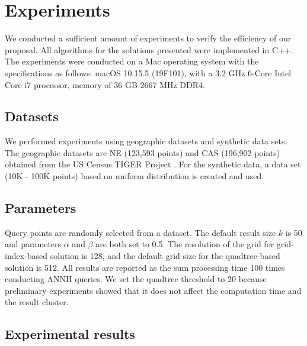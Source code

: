 \documentclass[a4paper,11pt]{report}
\theoremstyle{mytheoremstyle}
\begin{document}
\chapter{Experiments}
\label{section:experiments}

We conducted a sufficient amount of experiments to verify the efficiency of our proposal. All algorithms for the solutions presented were implemented in C++. The experiments were conducted on a Mac operating system with the specifications as follows: macOS 10.15.5 (19F101), with a 3.2 GHz 6-Core Intel Core i7 processor, memory of 36 GB 2667 MHz DDR4.

\section{Datasets}
We performed experiments using geographic datasets and synthetic data sets. The geographic datasets are NE (123,593 points) and CAS (196,902 points) obtained from the US Census TIGER Project \cite{chorochronos}. For the synthetic data, a data set (10K - 100K points) based on uniform distribution is created and used.

\section{Parameters}
Query points are randomly selected from a dataset. The default result size $k$ is 50 and parameters $\alpha$ and $\beta$ are both set to 0.5. The resolution of the grid for grid-index-based solution is 128, and the default grid size for the quadtree-based solution is 512. All results are reported as the sum processing time 100 times conducting ANNH queries. We set the quadtree threshold to 20 because preliminary experiments showed that it does not affect the computation time and the result cluster.

\section{Experimental results}
\end{document}

